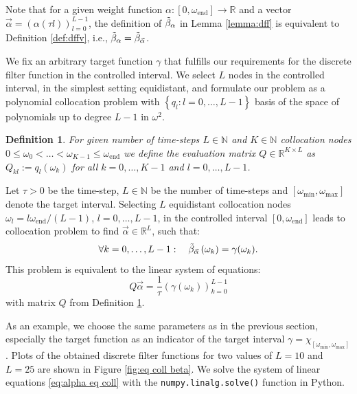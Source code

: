 \documentclass[a4paper,11pt,bibliography=totoc,listof=totoc,headinclude=true,cleardoublepage=empty,oneside]{scrbook}
\newtheorem{definition}[theorem]{Definition}
\newcommand{\R}{\mathbb{R}}
\newcommand{\N}{\mathbb{N}}
\newcommand{\dff}{\Tilde{\beta}_\alpha}
\newcommand{\dffv}{\Tilde{\beta}_{\Vec{\alpha}}}
\newcommand{\e}{\mathrm{end}}
\begin{document}
Note that for a given weight function $\alpha: \left[0, \omega_\e\right] \rightarrow \R$ and a vector $\Vec{\alpha} = \left(\alpha(\tau l)\right)_{l=0}^{L-1}$, the definition of $\dff$ in Lemma \ref{lemma:dff} is equivalent to Definition \ref{def:dffv}, i.e., $\dff = \dffv$.

We fix an arbitrary target function $\gamma$ that fulfills our requirements for the discrete filter function in the controlled interval. We select $L$ nodes in the controlled interval, in the simplest setting equidistant, and formulate our problem as a polynomial collocation problem with $\left\{q_l : l=0, \dots, L-1\right\}$ basis of the space of polynomials up to degree $L-1$ in $\omega^2$.
\begin{definition}\label{def:evaluation matrix}
    For given number of time-steps $L\in \N$ and $K\in \N$ collocation nodes $ 0 \leqslant \omega_0 < \dots < \omega_{K-1} \leqslant \omega_\e$ we define the evaluation matrix $Q \in \R^{K\times L}$ as $Q_{kl} := q_l\left(\omega_k\right)$ for all $k=0, \dots, K-1$ and $l=0, \dots, L-1$. 
\end{definition}

Let $\tau>0$ be the time-step, $L\in \N$ be the number of time-steps and $\left[\omega_{\min}, \omega_{\max}\right]$ denote the target interval. Selecting $L$ equidistant collocation nodes $\omega_l = l\omega_\e/ (L-1)$, $l=0, \dots, L-1$, in the controlled interval $\left[0, \omega_{\e}\right]$ leads to collocation problem to find $\Vec{\alpha} \in \R^L$, such that:
\begin{equation*}
    \forall k = 0, \dots, L-1: \quad \dffv\left(\omega_k\right) = \gamma(\omega_k).
\end{equation*}
This problem is equivalent to the linear system of equations:
\begin{equation}\label{eq:alpha eq coll}
     Q \Vec{\alpha} = \frac{1}{\tau} \left(\gamma(\omega_k) \right)_{k=0}^{L-1}
\end{equation}
with matrix $Q$ from Definition \ref{def:evaluation matrix}.

As an example, we choose the same parameters as in the previous section, especially the target function as an indicator of the target interval $\gamma = \chi_{\left[\omega_{\min}, \omega_{\max}\right]}$. Plots of the obtained discrete filter functions for two values of $L = 10 $ and $L=25$ are shown in Figure \ref{fig:eq coll beta}. We solve the system of linear equations \eqref{eq:alpha eq coll} with the \texttt{numpy.linalg.solve()} function in Python.
\end{document}
